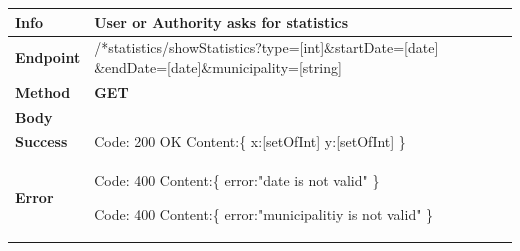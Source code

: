 \begin{table}[H]
\begin{tabular}{|l|p{}|}
\hline
\textbf{Info}             & User or Authority asks for statistics                                                        \\ \hline
\textbf{Endpoint}    &  /*statistics/showStatistics?type=[int]\&startDate=[date] \newline \&endDate=[date]\&municipality=[string] \\ \hline
\textbf{Method}         &   \textbf{GET}                                                                            \\ \hline

\textbf{Body}  & 
                    \\ \hline
                    
\textbf{Success} &  Code: 200 OK \newline
                    Content:\{\newline 
            x:[setOfInt]\newline
            y:[setOfInt]\newline
                    \}\\ \hline
\textbf{Error} &  
                 
                  Code: 400 \newline
                  Content:\{\newline
                  error:"date is not valid" \newline\}\newline
                  
                   Code: 400 \newline
                  Content:\{\newline
                  error:"municipalitiy is not valid" \newline\}
                  
                \\\hline

\end{tabular}
\end{table}







